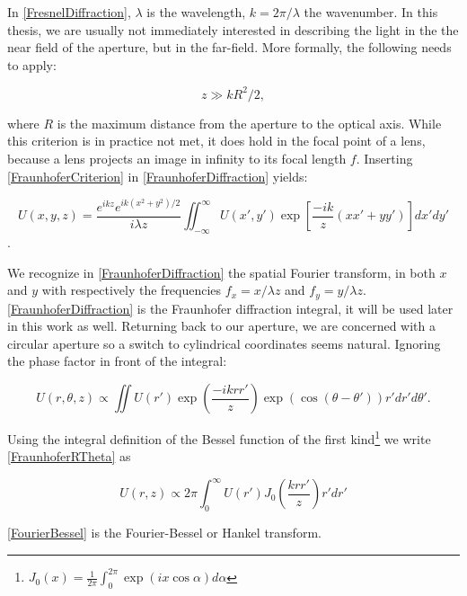 In \cref{FresnelDiffraction}, $\lambda$ is the wavelength, $k=2\pi/\lambda$ the wavenumber. In this thesis, we are usually not immediately interested in describing the light in the the near field of the aperture, but in the far-field. More formally, the following needs to apply:

\begin{equation}\label{FraunhoferCriterion}
    z \gg k R^2/2,
\end{equation}

where $R$ is the maximum distance from the aperture to the optical axis. While this criterion is in practice not met, it does hold in the focal point of a lens, because a lens projects an image in infinity to its focal length $f$. Inserting \cref{FraunhoferCriterion} in \cref{FraunhoferDiffraction} yields:

\begin{equation}\label{FraunhoferDiffraction}
    U(x, y, z)=\frac{e^{i k z} e^{i k\left(x^{2}+y^{2}\right)/2}}{i \lambda z} \iint_{-\infty}^{\infty} U(x', y') \exp \left[\frac{-ik}{z}(x x'+y y')\right] dx' dy'
\end{equation}. 

We recognize in \cref{FraunhoferDiffraction} the spatial Fourier transform, in both $x$ and $y$ with respectively the frequencies $f_x = x/\lambda z$ and $f_y = y/\lambda z$. \cref{FraunhoferDiffraction} is the Fraunhofer diffraction integral, it will be used later in this work as well. Returning back to our aperture, we are concerned with a circular aperture so a switch to cylindrical coordinates seems natural. Ignoring the phase factor in front of the integral:

\begin{equation}\label{FraunhoferRTheta}
    U(r,\theta, z) \propto \iint U(r') \exp{(\frac{- i k rr'}{z})} \exp{\left(\cos{(\theta-\theta')}\right)} r'dr'd\theta'.
\end{equation}

Using the integral definition of the Bessel function of the first kind\footnote{$J_0(x) = \frac{1}{2\pi} \int_0^{2\pi} \exp{(i x \cos{\alpha})} d\alpha$} we write \cref{FraunhoferRTheta} as 

\begin{equation}\label{FourierBessel}
    U(r,z) \propto 2\pi \int_0^{\infty} U(r') J_0\left( \frac{k r r'}{z}\right) r'dr'
\end{equation}

\cref{FourierBessel} is the Fourier-Bessel or Hankel transform. 

